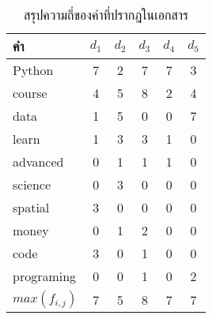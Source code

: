 \documentclass[11pt,a4paper]{article}
\newcommand{\fir}{Python}
\newcommand{\seco}{course}
\newcommand{\thi}{data}
\newcommand{\fou}{learn}
\newcommand{\fif}{advanced}
\newcommand{\six}{science}
\newcommand{\sev}{spatial}
\newcommand{\eig}{money}
\newcommand{\nin}{code}
\newcommand{\ten}{programing}
\begin{document}
    \begin{table}[ht!]
        \centering
        \caption{สรุปความถี่ของคำที่ปรากฎในเอกสาร}
        \begin{tabular}{ p{3cm}ccccc}
            \hline
            คำ              & $d_1$ &  $d_2$    &  $d_3$    &  $d_4$    &  $d_5$ \\
            \hline \hline
            \fir            & 7     &  2        &  7        &  7        &  3  \\
            \seco           & 4     &  5        &  8        &  2        &  4  \\
            \thi            & 1     &  5        &  0        &  0        &  7  \\
            \fou            & 1     &  3        &  3        &  1        &  0  \\
            \fif            & 0     &  1        &  1        &  1        &  0  \\
            \six            & 0     &  3        &  0        &  0        &  0  \\
            \sev            & 3     &  0        &  0        &  0        &  0  \\
            \eig            & 0     &  1        &  2        &  0        &  0  \\
            \nin            & 3     &  0        &  1        &  0        &  0 \\
            \ten            & 0     &  0        &  1        &  0        &  2  \\
            \hline 
            $max(f_{i,j})$  & 7     &  5        &  8        &  7        &  7  \\
            \hline
        \end{tabular}
    \end{table}
\end{document}
